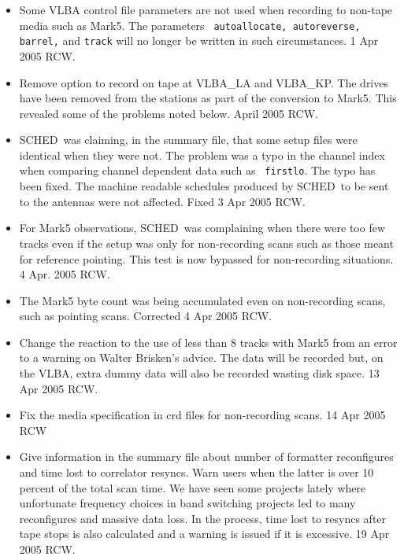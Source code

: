 \documentclass{report}
\newcommand{\schedb}{{\sc SCHED~}}
\begin{document}
\begin{itemize}

\item  Some VLBA control file parameters are not used when
recording to non-tape media such as Mark5.  The parameters {\tt
autoallocate, autoreverse, barrel,} and {\tt track} will no longer
be written in such circumstances.  1 Apr 2005  RCW.

\item Remove option to record on tape at VLBA\_LA and VLBA\_KP.  The
drives have been removed from the stations as part of the conversion to
Mark5.  This revealed some of the problems noted below.  April 2005  RCW.

\item \schedb was claiming, in the summary file, that some setup files
were identical when they were not.  The problem was a typo in the
channel index when comparing channel dependent data such as {\tt
firstlo}.  The typo has been fixed.  The machine readable schedules
produced by \schedb to be sent to the antennas were not affected.
Fixed 3 Apr 2005 RCW.

\item For Mark5 observations, \schedb was complaining when there were
too few tracks even if the setup was only for non-recording scans such
as those meant for reference pointing.  This test is now bypassed for
non-recording situations.  4 Apr. 2005 RCW.

\item  The Mark5 byte count was being accumulated even on non-recording
scans, such as pointing scans.  Corrected  4 Apr 2005 RCW.

\item Change the reaction to the use of less than 8 tracks with Mark5
from an error to a warning on Walter Brisken's advice.  The data will
be recorded but, on the VLBA, extra dummy data will also be recorded
wasting disk space.  13 Apr 2005 RCW.

\item Fix the media specification in crd files for non-recording scans.
14 Apr 2005  RCW

\item Give information in the summary file about number of formatter
reconfigures and time lost to correlator resyncs.  Warn users when the
latter is over 10 percent of the total scan time.  We have seen some
projects lately where unfortunate frequency choices in band switching
projects led to many reconfigures and massive data loss.  In the process,
time lost to resyncs after tape stops is also calculated and a warning
is issued if it is excessive.  19 Apr 2005  RCW.


\end{itemize}
\end{document}
